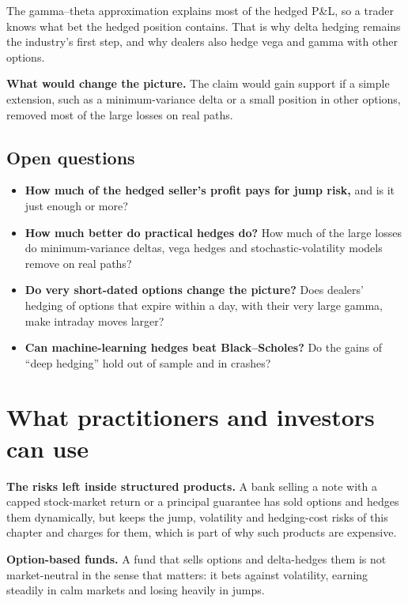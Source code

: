 The gamma--theta approximation explains most of the hedged P\&L, so a trader knows what bet the hedged position contains. That is why delta hedging remains the industry's first step, and why dealers also hedge vega and gamma with other options.

\textbf{What would change the picture.} The claim would gain support if a simple extension, such as a minimum-variance delta or a small position in other options, removed most of the large losses on real paths.

\subsection{Open questions}
\label{sec:14-open}

\begin{itemize}
  \item \textbf{How much of the hedged seller's profit pays for jump risk,} and is it just enough or more?
  \item \textbf{How much better do practical hedges do?} How much of the large losses do minimum-variance deltas, vega hedges and stochastic-volatility models remove on real paths?
  \item \textbf{Do very short-dated options change the picture?} Does dealers' hedging of options that expire within a day, with their very large gamma, make intraday moves larger?
  \item \textbf{Can machine-learning hedges beat Black--Scholes?} Do the gains of ``deep hedging'' hold out of sample and in crashes?
\end{itemize}

\section{What practitioners and investors can use}
\label{sec:14-investors}

\textbf{The risks left inside structured products.} A bank selling a note with a capped stock-market return or a principal guarantee has sold options and hedges them dynamically, but keeps the jump, volatility and hedging-cost risks of this chapter and charges for them, which is part of why such products are expensive.

\textbf{Option-based funds.} A fund that sells options and delta-hedges them is not market-neutral in the sense that matters: it bets against volatility, earning steadily in calm markets and losing heavily in jumps.

